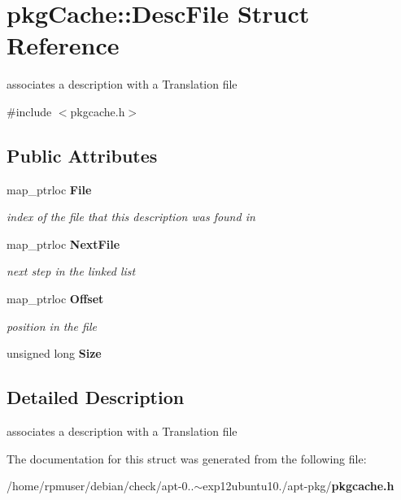 \section{pkg\-Cache\-:\-:\-Desc\-File \-Struct \-Reference}
\label{structpkgCache_1_1DescFile}


associates a description with a \-Translation file  




{\ttfamily \#include $<$pkgcache.\-h$>$}

\subsection*{\-Public \-Attributes}
\begin{DoxyCompactItemize}
\item 
map\-\_\-ptrloc {\bf \-File}\label{structpkgCache_1_1DescFile_af4599f7ab1abead5702621b8dd500703}

\begin{DoxyCompactList}\small\item\em index of the file that this description was found in \end{DoxyCompactList}\item 
map\-\_\-ptrloc {\bf \-Next\-File}\label{structpkgCache_1_1DescFile_a834318688de732bfd0e8c1a1e79c44be}

\begin{DoxyCompactList}\small\item\em next step in the linked list \end{DoxyCompactList}\item 
map\-\_\-ptrloc {\bf \-Offset}\label{structpkgCache_1_1DescFile_a21e5509b4e50fdbcd32f0907f6006b32}

\begin{DoxyCompactList}\small\item\em position in the file \end{DoxyCompactList}\item 
unsigned long {\bfseries \-Size}\label{structpkgCache_1_1DescFile_adc25a45dd4fc0985b33c968068f749c4}

\end{DoxyCompactItemize}


\subsection{\-Detailed \-Description}
associates a description with a \-Translation file 

\-The documentation for this struct was generated from the following file\-:\begin{DoxyCompactItemize}
\item 
/home/rpmuser/debian/check/apt-\/0..$\sim$exp12ubuntu10./apt-\/pkg/{\bf pkgcache.\-h}\end{DoxyCompactItemize}
